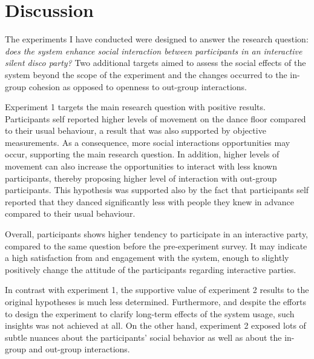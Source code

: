 \documentclass[a4paper,11pt]{article}
\begin{document}
\section{Discussion}


The experiments I have conducted were designed to answer the research question: \emph{does the system enhance social interaction between participants in an interactive silent disco party?}
Two additional targets aimed to assess the social effects of the system beyond the scope of the experiment and the changes occurred to the in-group cohesion as opposed to openness to out-group interactions.

Experiment 1 targets the main research question with positive results.
Participants self reported higher levels of movement on the dance floor compared to their usual behaviour, a result that was also supported by objective measurements.
As a consequence, more social interactions opportunities may occur, supporting the main research question.
In addition, higher levels of movement can also increase the opportunities to interact with less known participants, thereby proposing higher level of interaction with out-group participants.
This hypothesis was supported also by the fact that participants self reported that they danced significantly less with people they knew in advance compared to their usual behaviour.


Overall, participants shows higher tendency to participate in an interactive party, compared to the same question before the pre-experiment survey.
It may indicate a high satisfaction from and engagement with the system, enough to slightly positively change the attitude of the participants regarding interactive parties.

In contrast with experiment 1, the supportive value of experiment 2 results to the original hypotheses is much less determined.
Furthermore, and despite the efforts to design the experiment to clarify long-term effects of the system usage, such insights was not achieved at all.
On the other hand, experiment 2 exposed lots of subtle nuances about the participants' social behavior as well as about the in-group and out-group interactions.
\end{document}
